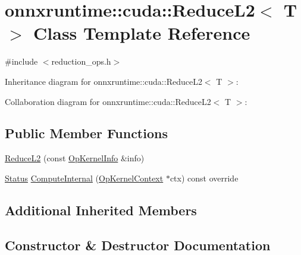 \hypertarget{classonnxruntime_1_1cuda_1_1ReduceL2}{}\section{onnxruntime\+:\+:cuda\+:\+:Reduce\+L2$<$ T $>$ Class Template Reference}
\label{classonnxruntime_1_1cuda_1_1ReduceL2}


{\ttfamily \#include $<$reduction\+\_\+ops.\+h$>$}



Inheritance diagram for onnxruntime\+:\+:cuda\+:\+:Reduce\+L2$<$ T $>$\+:


Collaboration diagram for onnxruntime\+:\+:cuda\+:\+:Reduce\+L2$<$ T $>$\+:
\subsection*{Public Member Functions}
\begin{DoxyCompactItemize}
\item 
\mbox{\hyperlink{classonnxruntime_1_1cuda_1_1ReduceL2_a217e7c10fb1c9ca0d752b83b4bd9650b}{Reduce\+L2}} (const \mbox{\hyperlink{classonnxruntime_1_1OpKernelInfo}{Op\+Kernel\+Info}} \&info)
\item 
\mbox{\hyperlink{classonnxruntime_1_1common_1_1Status}{Status}} \mbox{\hyperlink{classonnxruntime_1_1cuda_1_1ReduceL2_a4891c57ba263b1d3926d273eb18f64af}{Compute\+Internal}} (\mbox{\hyperlink{classonnxruntime_1_1OpKernelContext}{Op\+Kernel\+Context}} $\ast$ctx) const override
\end{DoxyCompactItemize}
\subsection*{Additional Inherited Members}


\subsection{Constructor \& Destructor Documentation}
\mbox{\label{classonnxruntime_1_1cuda_1_1ReduceL2_a217e7c10fb1c9ca0d752b83b4bd9650b}} 
